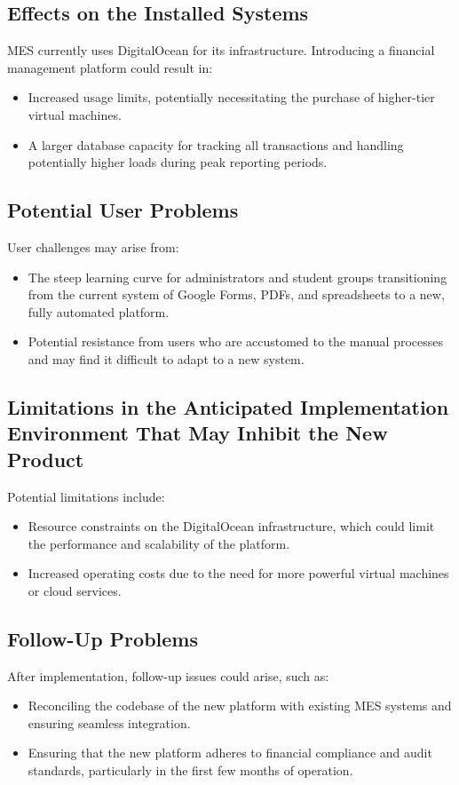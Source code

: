 \documentclass[12pt]{article}
\begin{document}
\subsection{Effects on the Installed Systems}
MES currently uses DigitalOcean for its infrastructure. Introducing a financial management platform could result in:
\begin{itemize}
    \item Increased usage limits, potentially necessitating the purchase of higher-tier virtual machines.
    \item A larger database capacity for tracking all transactions and handling potentially higher loads during peak reporting periods.
\end{itemize}

\subsection{Potential User Problems}
User challenges may arise from:
\begin{itemize}
    \item The steep learning curve for administrators and student groups transitioning from the current system of Google Forms, PDFs, and spreadsheets to a new, fully automated platform.
    \item Potential resistance from users who are accustomed to the manual processes and may find it difficult to adapt to a new system.
\end{itemize}

\subsection{Limitations in the Anticipated Implementation Environment That May Inhibit the New Product}
Potential limitations include:
\begin{itemize}
    \item Resource constraints on the DigitalOcean infrastructure, which could limit the performance and scalability of the platform.
    \item Increased operating costs due to the need for more powerful virtual machines or cloud services.
\end{itemize}

\subsection{Follow-Up Problems}
After implementation, follow-up issues could arise, such as:
\begin{itemize}
    \item Reconciling the codebase of the new platform with existing MES systems and ensuring seamless integration.
    \item Ensuring that the new platform adheres to financial compliance and audit standards, particularly in the first few months of operation.
\end{itemize}
\end{document}

